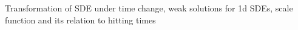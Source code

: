 Transformation of SDE under time change, weak solutions for 1d SDEs, scale function and its relation to hitting times